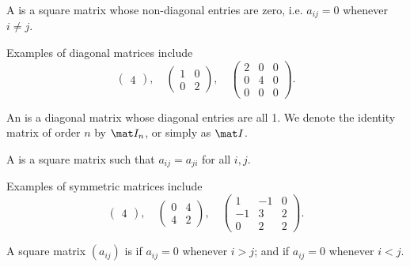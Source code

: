 \begin{definition}
    A  is a square matrix whose non-diagonal entries are zero, i.e. $a_{ij} = 0$ whenever $i \neq j$.
\end{definition}

\begin{example}
    Examples of diagonal matrices include \[\begin{pmatrix}4\end{pmatrix}, \quad \begin{pmatrix}1 & 0 \\ 0 & 2\end{pmatrix}, \quad \begin{pmatrix}2 & 0 & 0 \\ 0 & 4 & 0 \\ 0 & 0 & 0\end{pmatrix}.\]
\end{example}

\begin{definition}
    An  is a diagonal matrix whose diagonal entries are all 1. We denote the identity matrix of order $n$ by $\mat I_n$, or simply as $\mat I$.
\end{definition}

\begin{definition}
    A  is a square matrix such that $a_{ij} = a_{ji}$ for all $i, j$.
\end{definition}

\begin{example}
    Examples of symmetric matrices include \[\begin{pmatrix}4\end{pmatrix}, \quad \begin{pmatrix}0 & 4 \\ 4 & 2\end{pmatrix}, \quad \begin{pmatrix}1 & -1 & 0 \\ -1 & 3 & 2 \\ 0 & 2 & 2\end{pmatrix}.\]
\end{example}

\begin{definition}
    A square matrix $(a_{ij})$ is  if $a_{ij} = 0$ whenever $i > j$; and  if $a_{ij} = 0$ whenever $i < j$.
\end{definition}

